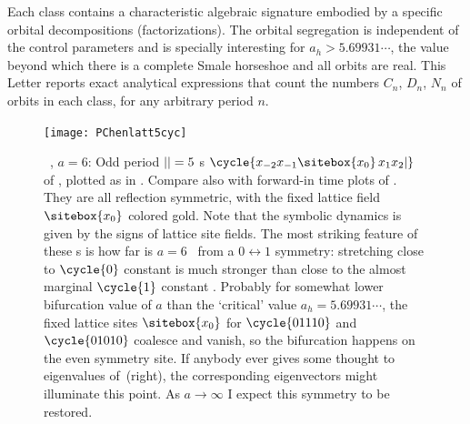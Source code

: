 \begin{description}
Each class contains a characteristic algebraic signature embodied by a
specific orbital decompositions (factorizations). The orbital
segregation is independent of the control parameters and is specially
interesting for $a_h >5.69931\cdots$, the value beyond which there is a
complete Smale horseshoe and all orbits are real.
This Letter  reports exact analytical expressions
that count the numbers $C_n$, $D_n$, $N_n$ of
orbits in each class, for any arbitrary period $n$.

\begin{figure}
  \centering
\texttt{[image: PChenlatt5cyc]} %
~~~~~~~~
  \caption{
\Henlatt\ , $a=6$:
Odd period  ${||}=5$ {\lattstate}s
$
\cycle{\ssp_{-2} \ssp_{-1} \sitebox{\ssp_0}\,\ssp_1 \ssp_2 |}
$
of ,
plotted as in
.
Compare also with forward-in time plots of .
They are all reflection symmetric, with
the fixed lattice field $\sitebox{\ssp_0}$ colored gold. Note that the
symbolic dynamics is given by the signs of lattice site fields.
The most striking feature of these {\lattstate}s is how far is $a=6$
\henlatt\ from a $0\leftrightarrow1$ symmetry: stretching close to
$\cycle{0}$ constant {\lattstate} is much stronger than close to the
almost marginal $\cycle{1}$ constant {\lattstate}. Probably for somewhat
lower bifurcation value of $a$ than the `critical' value
$a_h=5.69931\cdots$, the fixed lattice sites $\sitebox{\ssp_0}$ for
$\cycle{01110}$ and $\cycle{01010}$ coalesce and vanish, so the
bifurcation happens on the even symmetry site.
{\color{red}If anybody ever gives some thought to {\jacobianOrb}
eigenvalues of \,(right), the corresponding
eigenvectors might illuminate this point.} As $a\to\infty$ I expect this
symmetry to be restored.
}
\label{fig:PChenlatt5cyc} %
\end{figure}


\end{description}
